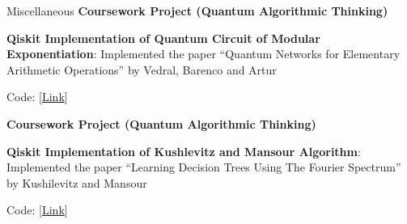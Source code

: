 \begin{rubric}{Miscellaneous}
\entry*[2023]%
	\textbf{Coursework Project (Quantum Algorithmic Thinking)}

   \textbf{Qiskit Implementation of Quantum Circuit of Modular Exponentiation}: Implemented the paper ``Quantum Networks for Elementary Arithmetic Operations” by Vedral, Barenco and Artur

    Code: [\href{hhttps://github.com/bluecheese123/-Best_Project-}{Link}]

\entry*[2023] \textbf{Coursework Project (Quantum Algorithmic Thinking)}

\textbf{Qiskit Implementation of Kushlevitz and Mansour Algorithm}: Implemented the paper ``Learning Decision Trees Using The Fourier Spectrum” by Kushilevitz and Mansour

    Code: [\href{https://github.com/sohamch08/Qiskit-Quantum-Algo/blob/master/Kushlevitz and Mansour Algorithm.ipynb}{Link}]

\end{rubric}